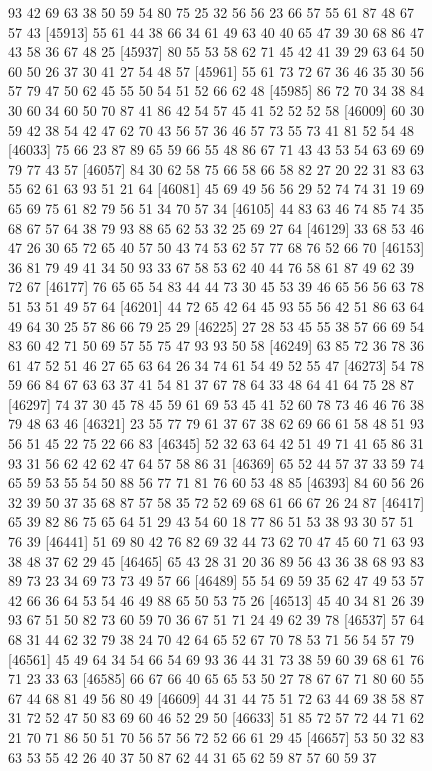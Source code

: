 \documentclass{article}
\begin{document}
\begin{figure}[H]
\begin{Schunk}
\begin{Soutput}
[45889] 93 42 69 63 38 50 59 54 80 75 25 32 56 56 23 66 57 55 61 87 48 67 57 43
[45913] 55 61 44 38 66 34 61 49 63 40 40 65 47 39 30 68 86 47 43 58 36 67 48 25
[45937] 80 55 53 58 62 71 45 42 41 39 29 63 64 50 60 50 26 37 30 41 27 54 48 57
[45961] 55 61 73 72 67 36 46 35 30 56 57 79 47 50 62 45 55 50 54 51 52 66 62 48
[45985] 86 72 70 34 38 84 30 60 34 60 50 70 87 41 86 42 54 57 45 41 52 52 52 58
[46009] 60 30 59 42 38 54 42 47 62 70 43 56 57 36 46 57 73 55 73 41 81 52 54 48
[46033] 75 66 23 87 89 65 59 66 55 48 86 67 71 43 43 53 54 63 69 69 79 77 43 57
[46057] 84 30 62 58 75 66 58 66 58 82 27 20 22 31 83 63 55 62 61 63 93 51 21 64
[46081] 45 69 49 56 56 29 52 74 74 31 19 69 65 69 75 61 82 79 56 51 34 70 57 34
[46105] 44 83 63 46 74 85 74 35 68 67 57 64 38 79 93 88 65 62 53 32 25 69 27 64
[46129] 33 68 53 46 47 26 30 65 72 65 40 57 50 43 74 53 62 57 77 68 76 52 66 70
[46153] 36 81 79 49 41 34 50 93 33 67 58 53 62 40 44 76 58 61 87 49 62 39 72 67
[46177] 76 65 65 54 83 44 44 73 30 45 53 39 46 65 56 56 63 78 51 53 51 49 57 64
[46201] 44 72 65 42 64 45 93 55 56 42 51 86 63 64 49 64 30 25 57 86 66 79 25 29
[46225] 27 28 53 45 55 38 57 66 69 54 83 60 42 71 50 69 57 55 75 47 93 93 50 58
[46249] 63 85 72 36 78 36 61 47 52 51 46 27 65 63 64 26 34 74 61 54 49 52 55 47
[46273] 54 78 59 66 84 67 63 63 37 41 54 81 37 67 78 64 33 48 64 41 64 75 28 87
[46297] 74 37 30 45 78 45 59 61 69 53 45 41 52 60 78 73 46 46 76 38 79 48 63 46
[46321] 23 55 77 79 61 37 67 38 62 69 66 61 58 48 51 93 56 51 45 22 75 22 66 83
[46345] 52 32 63 64 42 51 49 71 41 65 86 31 93 31 56 62 42 62 47 64 57 58 86 31
[46369] 65 52 44 57 37 33 59 74 65 59 53 55 54 50 88 56 77 71 81 76 60 53 48 85
[46393] 84 60 56 26 32 39 50 37 35 68 87 57 58 35 72 52 69 68 61 66 67 26 24 87
[46417] 65 39 82 86 75 65 64 51 29 43 54 60 18 77 86 51 53 38 93 30 57 51 76 39
[46441] 51 69 80 42 76 82 69 32 44 73 62 70 47 45 60 71 63 93 38 48 37 62 29 45
[46465] 65 43 28 31 20 36 89 56 43 36 38 68 93 83 89 73 23 34 69 73 73 49 57 66
[46489] 55 54 69 59 35 62 47 49 53 57 42 66 36 64 53 54 46 49 88 65 50 53 75 26
[46513] 45 40 34 81 26 39 93 67 51 50 82 73 60 59 70 36 67 51 71 24 49 62 39 78
[46537] 57 64 68 31 44 62 32 79 38 24 70 42 64 65 52 67 70 78 53 71 56 54 57 79
[46561] 45 49 64 34 54 66 54 69 93 36 44 31 73 38 59 60 39 68 61 76 71 23 33 63
[46585] 66 67 66 40 65 65 53 50 27 78 67 67 71 80 60 55 67 44 68 81 49 56 80 49
[46609] 44 31 44 75 51 72 63 44 69 38 58 87 31 72 52 47 50 83 69 60 46 52 29 50
[46633] 51 85 72 57 72 44 71 62 21 70 71 86 50 51 70 56 57 56 72 52 66 61 29 45
[46657] 53 50 32 83 63 53 55 42 26 40 37 50 87 62 44 31 65 62 59 87 57 60 59 37

\end{Soutput}
\end{Schunk}
\end{figure}
\end{document}
